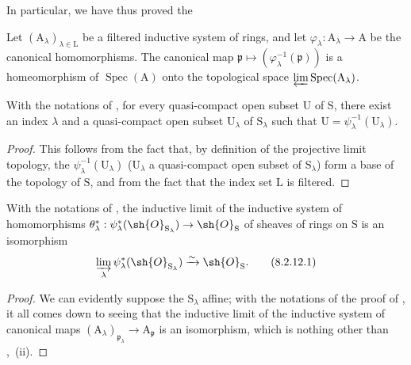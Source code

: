 In particular, we have thus proved the

\begin{corollary}[8.2.10]
\label{IV.8.2.10}
Let $(\mathrm{A}_\lambda)_{\lambda\in\mathrm{L}}$ be a filtered inductive system of rings, and let $\varphi_\lambda:\mathrm{A}_\lambda\to\mathrm{A}$ be the canonical homomorphisms.
The canonical map $\mathfrak{p}\mapsto(\varphi_\lambda^{-1}(\mathfrak{p}))$ is a homeomorphism of $\operatorname{Spec}(\mathrm{A})$ onto the topological space $\varprojlim\operatorname{Spec}(\mathrm{A}_\lambda)$.
\end{corollary}

\begin{corollary}[8.2.11]
\label{IV.8.2.11}
With the notations of , for every quasi-compact open subset $\mathrm{U}$ of $\mathrm{S}$, there exist an index $\lambda$ and a quasi-compact open subset $\mathrm{U}_\lambda$ of $\mathrm{S}_\lambda$ such that $\mathrm{U}=\psi_\lambda^{-1}(\mathrm{U}_\lambda)$.
\end{corollary}

\begin{proof}
This follows from the fact that, by definition of the projective limit topology, the $\psi_\lambda^{-1}(\mathrm{U}_\lambda)$ ($\mathrm{U}_\lambda$ a quasi-compact open subset of $\mathrm{S}_\lambda$) form a base of the topology of $\mathrm{S}$, and from the fact that the index set $\mathrm{L}$ is filtered.
\end{proof}

\begin{corollary}[8.2.12]
\label{IV.8.2.12}
With the notations of , the inductive limit of the inductive system of homomorphisms $\theta_\lambda^*:\psi_\lambda^*(\sh{O}_{\mathrm{S}_\lambda})\to\sh{O}_\mathrm{S}$ of sheaves of rings on $\mathrm{S}$ is an isomorphism
\begin{equation}
  \varinjlim_\lambda\psi_\lambda^*(\sh{O}_{\mathrm{S}_\lambda})\xrightarrow{\sim}\sh{O}_\mathrm{S}.
  \label{IV.8.2.12.1}
\tag{8.2.12.1}
\end{equation}
\end{corollary}

\begin{proof}
We can evidently suppose the $\mathrm{S}_\lambda$ affine; with the notations of the proof of , it all comes down to seeing that the inductive limit of the inductive system of canonical maps $(\mathrm{A}_\lambda)_{\mathfrak{p}_\lambda}\to\mathrm{A}_\mathfrak{p}$ is an isomorphism, which is nothing other than ,~(ii).
\end{proof}

